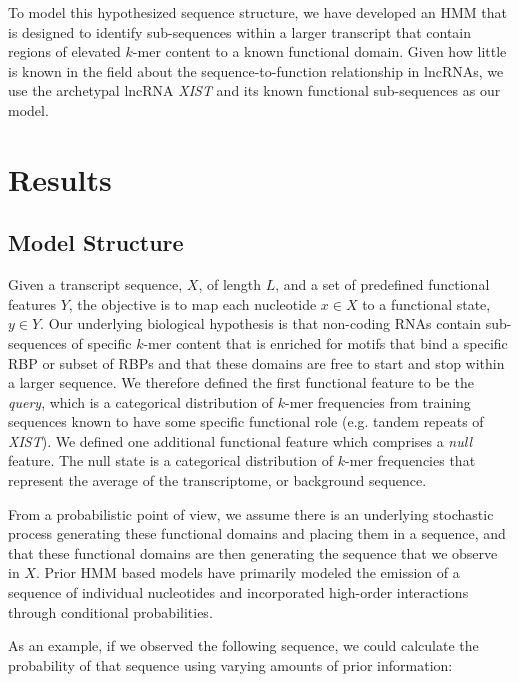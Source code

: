 To model this hypothesized sequence structure, we have developed an HMM that is designed to identify sub-sequences within a larger transcript that contain regions of elevated $k$-mer content to a known functional domain. Given how little is known in the field about the sequence-to-function relationship in lncRNAs, we use the archetypal lncRNA \emph{XIST} and its known functional sub-sequences as our model. 
\section{Results}
\subsection{Model Structure}
Given a transcript sequence, $X$, of length $L$, and a set of predefined functional features $Y$, the objective is to map each nucleotide $x \in X$ to a functional state, $y \in Y$. Our underlying biological hypothesis is that non-coding RNAs contain sub-sequences of specific $k$-mer content that is enriched for motifs that bind a specific RBP or subset of RBPs and that these domains are free to start and stop within a larger sequence. We therefore defined the first functional feature to be the \emph{query}, which is a categorical distribution of $k$-mer frequencies from training sequences known to have some specific functional role (e.g. tandem repeats of \emph{XIST}). We defined one additional functional feature which comprises a \emph{null} feature. The null state is a categorical distribution of $k$-mer frequencies that represent the average of the transcriptome, or background sequence. 

From a probabilistic point of view, we assume there is an underlying stochastic process generating these functional domains and placing them in a sequence, and that these functional domains are then generating the sequence that we observe in $X$. Prior HMM based models have primarily modeled the emission of a sequence of individual nucleotides and incorporated high-order interactions through conditional probabilities. 

As an example, if we observed the following sequence, we could calculate the probability of that sequence using varying amounts of prior information:

